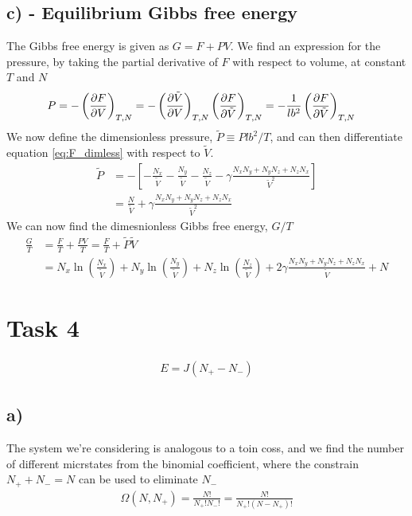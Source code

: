 \documentclass[reprint,english,notitlepage,aps,nobalancelastpage,nofootinbib]{revtex4-1}
\newcommand{\closed}[1]{\left(#1\right)}
\newcommand{\bracket}[1]{\left[#1\right]}
\newcommand{\tmdv}[4]{\closed{\pdv{#1}{#2}}_{#3,#4}}
\newcommand{\nx}{N_x}
\newcommand{\ny}{N_y}
\newcommand{\nz}{N_z}
\newcommand{\V}{\tilde{V}}
\renewcommand{\P}{\tilde{P}}
\newcommand{\np}{N_+}
\begin{document}
\subsection*{c) - Equilibrium Gibbs free energy}
The Gibbs free energy is given as $G=F+PV$. We find an expression for the pressure, by taking the partial derivative of $F$ with respect to volume, at constant $T$ and $N$
\begin{align*}
	P &= -\tmdv{F}{V}{T}{N} = -\tmdv{\V}{V}{T}{N}\tmdv{F}{\V}{T}{N}=-\frac{1}{lb^2}\tmdv{F}{\V}{T}{N}
\end{align*}
We now define the dimensionless pressure, $\P\equiv Plb^2/T$, and can then differentiate equation \eqref{eq:F_dimless} with respect to $\V$.
\begin{align*}
	\P &= -\bracket{-\frac{\nx}{\V} -\frac{\ny}{\V} -\frac{\nz}{\V} - \gamma \frac{\nx\ny+\ny\nz+\nz\nx}{\V^2}} \\ 
	& = \frac{N}{\V} + \gamma \frac{\nx\ny+\ny\nz+\nz\nx}{\V^2} 
\end{align*}
We can now find the dimesnionless Gibbs free energy, $G/T$
\begin{align*}
	\frac{G}{T} &= \frac{F}{T} + \frac{PV}{T} = \frac{F}{T} + \P\V \\
	&= N_x \ln\closed{\frac{N_x}{\tilde{V}}} + N_y \ln\closed{\frac{N_y}{\tilde{V}}} + N_z \ln\closed{\frac{N_z}{\tilde{V}}} + 2\gamma \frac{\nx\ny+\ny\nz+\nz\nx}{\tilde{V}} + N 
\end{align*}


\section*{\large Task 4}

\begin{align} \label{eq:task4_energy}
	E=J(\np-N_-)
\end{align}

\subsection*{a)}
The system we're considering is analogous to a toin coss, and we find the number of different micrstates from the binomial coefficient, where the constrain $\np+N_-=N$ can be used to eliminate $N_-$
\begin{align*}
	\Omega(N,\np) = \frac{N!}{\np!N_-!}=\frac{N!}{\np!(N-\np)!}
\end{align*}
\end{document}
